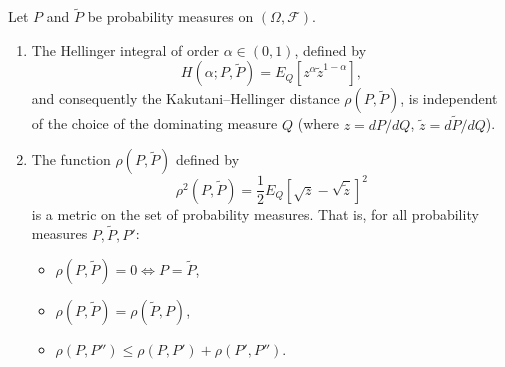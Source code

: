 Let $P$ and $\tilde{P}$ be probability measures on $(\Omega, \mathcal{F})$.

\begin{enumerate}
\item The Hellinger integral of order $\alpha \in (0, 1)$, defined by
$$H(\alpha; P, \tilde{P}) = E_Q\left[z^\alpha \tilde{z}^{1-\alpha}\right],$$
and consequently the Kakutani--Hellinger distance $\rho(P, \tilde{P})$, is independent of the choice of the dominating measure $Q$ (where $z = dP/dQ$, $\tilde{z} = d\tilde{P}/dQ$).

\item The function $\rho(P, \tilde{P})$ defined by
$$\rho^2(P, \tilde{P}) = \frac{1}{2} E_Q\left[\sqrt{z} - \sqrt{\tilde{z}}\right]^2$$
is a metric on the set of probability measures. That is, for all probability measures $P, \tilde{P}, P'$:
\begin{itemize}
\item $\rho(P, \tilde{P}) = 0 \iff P = \tilde{P}$,
\item $\rho(P, \tilde{P}) = \rho(\tilde{P}, P)$,
\item $\rho(P, P'') \leq \rho(P, P') + \rho(P', P'')$.
\end{itemize}
\end{enumerate}
